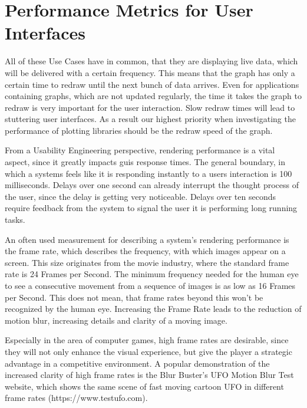 \section{Performance Metrics for User Interfaces}
\label{sec:usecases:metrics}

All of these Use Cases have in common, that they are displaying live data, which
will be delivered with a certain frequency. This means that the graph has only a
certain time to redraw until the next bunch of data arrives. Even for
applications containing graphs, which are not updated regularly, the time it
takes the graph to redraw is very important for the user interaction. Slow
redraw times will lead to stuttering user interfaces. As a result our highest
priority when investigating the performance of plotting libraries should be the
redraw speed of the graph.

From a Usability Engineering perspective, rendering performance is a vital
aspect, since it greatly impacts \glspl{gui} response times. The general
boundary, in which a systems feels like it is responding instantly to a users
interaction is 100 milliseconds. Delays over one second can already interrupt
the thought process of the user, since the delay is getting very noticeable.
Delays over ten seconds require feedback from the system to
signal the user it is performing long running tasks.
\cite{UsabilityEngineering}

An often used measurement for describing a system's rendering performance is the
frame rate, which describes the frequency, with which images appear on a screen.
This size originates from the movie industry, where the standard frame rate is 24
Frames per Second. The minimum frequency needed for the human eye to see a
consecutive movement from a sequence of images is as low as 16 Frames per
Second. This does not mean, that frame rates beyond this won't be recognized by
the human eye. Increasing the Frame Rate leads to the reduction of motion blur,
increasing details and clarity of a moving image.

Especially in the area of computer games, high frame rates are desirable, since
they will not only enhance the visual experience, but give the player a
strategic advantage in a competitive environment.  A popular demonstration of
the increased clarity of high frame rates is the Blur Buster's UFO Motion Blur
Test website, which shows the same scene of fast moving cartoon UFO in different
frame rates (https://www.testufo.com).

